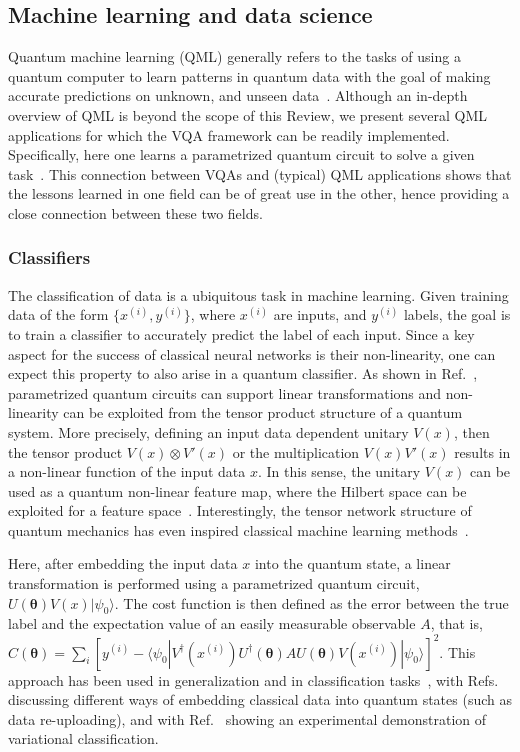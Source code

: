 \documentclass[prx,twocolumn,floatfix,superscriptaddress,longbibliography]{revtex4-1}
\renewcommand{\vec}[1]{\boldsymbol{#1}}  %
\newcommand{\<}{\langle}
\renewcommand{\>}{\rangle}
\renewcommand{\vec}[1]{\boldsymbol{#1}}  %
\begin{document}
\subsection{ Machine learning and data science}\label{sec:ML}


Quantum machine learning (QML) generally refers to the tasks of using a quantum computer to learn patterns in quantum data with the goal of making accurate predictions on unknown, and unseen data~\cite{biamonte2017quantum}. Although an in-depth overview of QML is beyond the scope of this Review, we present several QML applications for which the VQA framework can be readily implemented. Specifically, here one learns a parametrized quantum circuit to solve a given task~\cite{farhi2018classification,mitarai2018quantum}. This connection between VQAs and (typical) QML applications shows that the lessons learned in one field can be of great use in the other, hence providing a close connection between these two fields. 

\subsubsection{ Classifiers} The classification of data is a ubiquitous task in machine learning.  Given training data of the form $\{ x^{(i)}, y^{(i)}\}$, where $x^{(i)}$ are inputs, and $y^{(i)}$ labels, the goal is to train a classifier to accurately predict the label of each input. Since a key aspect for the success of classical neural networks is their non-linearity, one can expect this property to also arise in a quantum classifier. As shown in Ref.~\cite{schuld2020circuit}, parametrized quantum circuits can support linear transformations and non-linearity can be exploited from the tensor product structure of a quantum system. More precisely, defining an input data dependent unitary $V(x)$, then the tensor product $V(x) \otimes V'(x)$ or 
the multiplication $V(x) V'(x)$ results in a non-linear function of the input data $x$. In this sense, the unitary $V(x)$ can be used as a quantum non-linear feature map,
where the Hilbert space can be exploited for a feature space~\cite{schuld2019quantum,havlivcek2019supervised}. Interestingly, the tensor network structure of quantum mechanics has even inspired  classical machine learning methods~\cite{stoudenmire2016supervised}.

Here, after embedding the input data $x$ into the quantum state, a linear transformation is performed using a parametrized quantum circuit, $U(\vec{\theta}) V(x) |\psi _0 \rangle$.
The cost function is then defined as the error between the true label and the expectation value of an 
easily measurable observable $A$, that is, $C(\vec{\theta}) = \sum_i [ y^{(i)} - \langle \psi _0 | V^{\dag}(x^{(i)}) U^{\dag}(\vec{\theta}) A U(\vec{\theta}) V(x^{(i)}) |\psi _0 \rangle ]^2 $.
This approach has been used in generalization and in classification tasks~\cite{mitarai2018quantum,schuld2020circuit}, with Refs.~\cite{mitarai2018quantum,lloyd2020quantum,schuld2020effect,perez2020data} discussing different ways of embedding classical data into quantum states (such as data re-uploading), and with Ref.~\cite{havlivcek2019supervised} showing an experimental demonstration of variational classification. 
\end{document}
